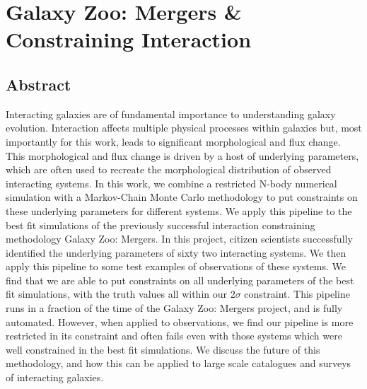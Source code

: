 \chapter{Galaxy Zoo: Mergers \& Constraining Interaction}\label{chapter4}
\section{Abstract}
    Interacting galaxies are of fundamental importance to understanding galaxy evolution. Interaction affects multiple physical processes within galaxies but, most importantly for this work, leads to significant morphological and flux change. This morphological and flux change is driven by a host of underlying parameters, which are often used to recreate the morphological distribution of observed interacting systems. In this work, we combine a restricted N-body numerical simulation with a Markov-Chain Monte Carlo methodology to put constraints on these underlying parameters for different systems. We apply this pipeline to the best fit simulations of the previously successful interaction constraining methodology Galaxy Zoo: Mergers. In this project, citizen scientists successfully identified the underlying parameters of sixty two interacting systems. We then apply this pipeline to some test examples of observations of these systems. We find that we are able to put constraints on all underlying parameters of the best fit simulations, with the truth values all within our 2$\sigma$ constraint. This pipeline runs in a fraction of the time of the Galaxy Zoo: Mergers project, and is fully automated. However, when applied to observations, we find our pipeline is more restricted in its constraint and often fails even with those systems which were well constrained in the best fit simulations. We discuss the future of this methodology, and how this can be applied to large scale catalogues and surveys of interacting galaxies.

